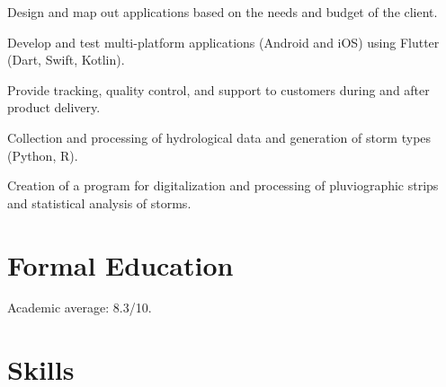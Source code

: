 \documentclass[]{robertino-cv}
\begin{document}
\begin{minipage}[t]{0.48\textwidth}
\begin{tightemize}
\item Design and map out applications based on the needs and budget of the client.
\item Develop and test multi-platform applications (Android and iOS) using Flutter (Dart, Swift, Kotlin).
\item Provide tracking, quality control, and support to customers during and after product delivery.
\end{tightemize}
\sectionsep

\begin{tightemize}
\item Collection and processing of hydrological data and generation of storm types (Python, R).
\item Creation of a program for digitalization and processing of pluviographic strips and statistical analysis of storms.
\end{tightemize}
\sectionsep



\section{Formal Education}

\begin{tightemize}
\item Academic average: 8.3/10.
\end{tightemize}
\sectionsep

\sectionsep

\section{Skills}

%
%

\end{minipage} 
\hfill
\end{document}
